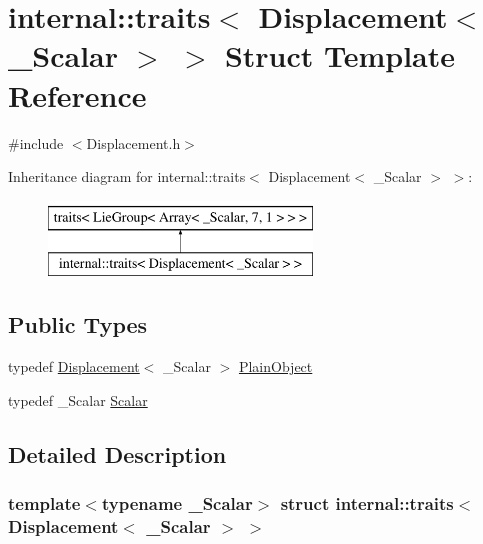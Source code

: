 \hypertarget{structinternal_1_1traits_3_01_displacement_3_01___scalar_01_4_01_4}{}\section{internal\+:\+:traits$<$ Displacement$<$ \+\_\+\+Scalar $>$ $>$ Struct Template Reference}
\label{structinternal_1_1traits_3_01_displacement_3_01___scalar_01_4_01_4}


{\ttfamily \#include $<$Displacement.\+h$>$}

Inheritance diagram for internal\+:\+:traits$<$ Displacement$<$ \+\_\+\+Scalar $>$ $>$\+:\begin{figure}[H]
\begin{center}
\leavevmode
\includegraphics[height=2.000000cm]{structinternal_1_1traits_3_01_displacement_3_01___scalar_01_4_01_4}
\end{center}
\end{figure}
\subsection*{Public Types}
\begin{DoxyCompactItemize}
\item 
typedef \hyperlink{class_displacement}{Displacement}$<$ \+\_\+\+Scalar $>$ \hyperlink{structinternal_1_1traits_3_01_displacement_3_01___scalar_01_4_01_4_af6e4238e8d42d544cfad72771d52f368}{Plain\+Object}
\item 
typedef \+\_\+\+Scalar \hyperlink{structinternal_1_1traits_3_01_displacement_3_01___scalar_01_4_01_4_a599bdd94fc645c9d06a36202d58f0ed8}{Scalar}
\end{DoxyCompactItemize}


\subsection{Detailed Description}
\subsubsection*{template$<$typename \+\_\+\+Scalar$>$\newline
struct internal\+::traits$<$ Displacement$<$ \+\_\+\+Scalar $>$ $>$}



